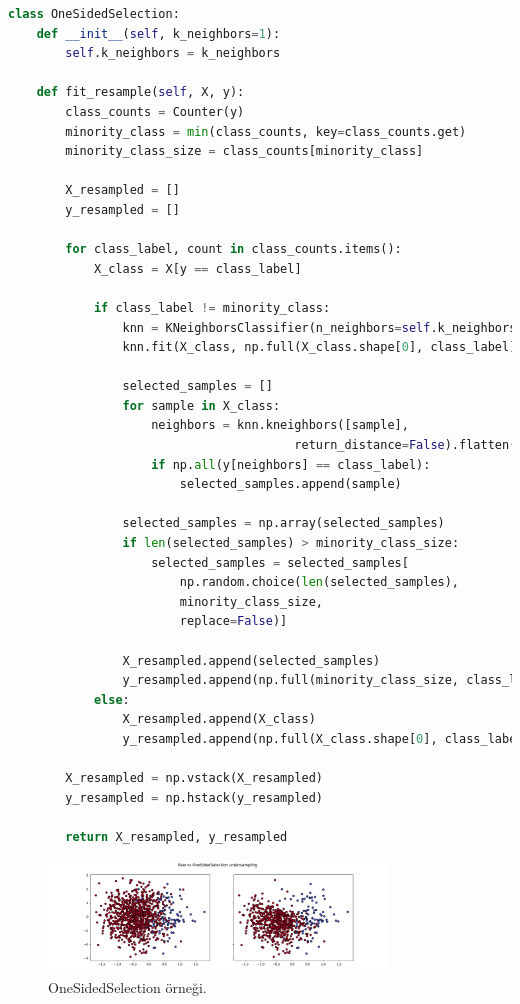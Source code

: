 \begin{lstlisting}[language=Python]
class OneSidedSelection:
    def __init__(self, k_neighbors=1):
        self.k_neighbors = k_neighbors

    def fit_resample(self, X, y):
        class_counts = Counter(y)
        minority_class = min(class_counts, key=class_counts.get)
        minority_class_size = class_counts[minority_class]

        X_resampled = []
        y_resampled = []

        for class_label, count in class_counts.items():
            X_class = X[y == class_label]

            if class_label != minority_class:
                knn = KNeighborsClassifier(n_neighbors=self.k_neighbors)
                knn.fit(X_class, np.full(X_class.shape[0], class_label))

                selected_samples = []
                for sample in X_class:
                    neighbors = knn.kneighbors([sample], 
                                        return_distance=False).flatten()
                    if np.all(y[neighbors] == class_label):
                        selected_samples.append(sample)

                selected_samples = np.array(selected_samples)
                if len(selected_samples) > minority_class_size:
                    selected_samples = selected_samples[
                        np.random.choice(len(selected_samples), 
                        minority_class_size, 
                        replace=False)]

                X_resampled.append(selected_samples)
                y_resampled.append(np.full(minority_class_size, class_label))
            else:
                X_resampled.append(X_class)
                y_resampled.append(np.full(X_class.shape[0], class_label))

        X_resampled = np.vstack(X_resampled)
        y_resampled = np.hstack(y_resampled)

        return X_resampled, y_resampled
\end{lstlisting}

\begin{figure}[h]
    \centering
    \includegraphics[width=0.8\textwidth]{images/Raw vs OneSidedSelection undersampling.png}
    \caption{OneSidedSelection örneği.}
    \label{fig:enter-label}
\end{figure}

